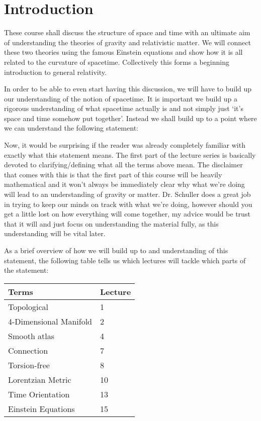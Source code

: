 \chapter{Introduction}

These course shall discuss the structure of space and time with an ultimate aim of understanding the theories of gravity and relativistic matter. We will connect these two theories using the famous Einstein equations and show how it is all related to the curvature of spacetime. Collectively this forms a beginning introduction to general relativity. 

In order to be able to even start having this discussion, we will have to build up our understanding of the notion of spacetime. It is important we build up a rigorous understanding of what spacetime actually is and not simply just `it's space and time somehow put together'. Instead we shall build up to a point where we can understand the following statement:


Now, it would be surprising if the reader was already completely familiar with exactly what this statement means. The first part of the lecture series is basically devoted to clarifying/defining what all the terms above mean. The disclaimer that comes with this is that the first part of this course will be heavily mathematical and it won't always be immediately clear why what we're doing will lead to an understanding of gravity or matter. Dr. Schuller does a great job in trying to keep our minds on track with what we're doing, however should you get a little lost on how everything will come together, my advice would be trust that it will and just focus on understanding the material fully, as this understanding will be vital later. 

As a brief overview of how we will build up to and understanding of this statement, the following table tells us which lectures will tackle which parts of the statement:

\begin{center}
	\begin{tabular}{@{} p{5cm}p{1.5cm}@{}}
		\toprule
		Terms & Lecture\\
		\midrule 
		Topological & 1 \\
		4-Dimensional Manifold & 2 \\
		Smooth atlas & 4 \\
		Connection & 7 \\
		Torsion-free & 8 \\
		Lorentzian Metric & 10 \\
		Time Orientation & 13 \\
		Einstein Equations & 15 \\
		\bottomrule
	\end{tabular}
\end{center}

